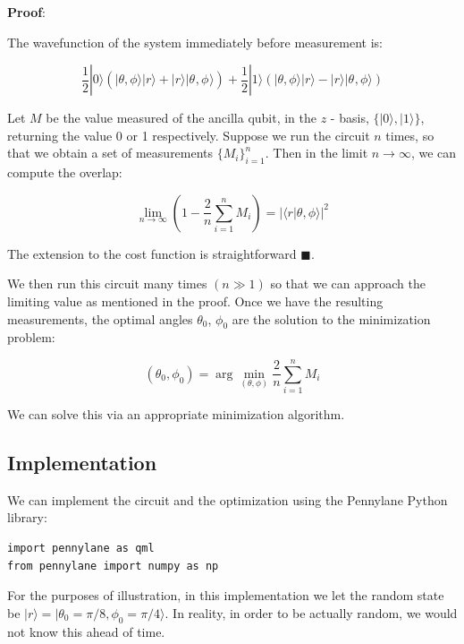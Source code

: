 \documentclass[11pt]{article}
\begin{document}
\textbf{\textbf{Proof}}:

The wavefunction of the system immediately before measurement is:


\[
\frac{1}{2}|0\rangle \left( |\theta,\phi \rangle|r\rangle + |r\rangle|\theta_{},\phi_{}\rangle \right) +
 \frac{1}{2}|1\rangle \left(|\theta,\phi\rangle|r\rangle - |r\rangle|\theta_{},\phi\rangle \right)
\]

Let \(M\) be the value measured of the ancilla qubit, in the \(z\) - basis, \(\{|0\rangle, |1\rangle \}\), returning the value 0 or 1 respectively. Suppose we run the circuit \(n\) times, so that we obtain a set of measurements \(\{ M_i \}_{i=1}^n\). Then in the limit \(n\to\infty\), we can compute the overlap:

\begin{equation*}
\lim_{n\to\infty } \left( 1 - \frac{2}{n}\sum_{i=1}^n M_i \right) = |\langle r | \theta, \phi \rangle|^2
\end{equation*}


The extension to the cost function is straightforward \(\blacksquare\).


We then run this circuit many times \((n \gg 1)\) so that we can approach the limiting value as mentioned in the proof. Once we have the resulting measurements, the optimal angles \(\theta_0\), \(\phi_0\) are the solution to the minimization problem:

\begin{equation*}
(\theta_{0}, \phi_{0}) = \arg\min_{(\theta, \phi)} \frac{2}{n}\sum_{i=1}^{n} M_i
\end{equation*}

We can solve this via an appropriate minimization algorithm.

\pagebreak

\subsection{Implementation}
\label{sec:org60df864}


We can implement the circuit and the optimization using the Pennylane Python library:

\begin{verbatim}
import pennylane as qml
from pennylane import numpy as np
\end{verbatim}

For the purposes of illustration, in this implementation we let the random state be \(|r\rangle = |\theta_0=\pi/8, \phi_0=\pi/4 \rangle\). In reality, in order to be actually random, we would not know this ahead of time.
\end{document}
